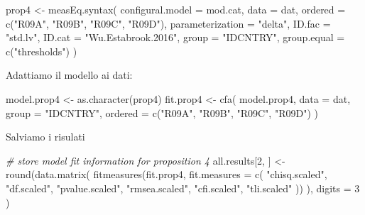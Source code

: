 \documentclass[
  11pt,
]{krantz}
\makeatletter
\newenvironment{Shaded}{\begin{snugshade}}{\end{snugshade}}
\newcommand{\AttributeTok}[1]{\textcolor[rgb]{0.61,0.61,0.61}{#1}}
\newcommand{\CommentTok}[1]{\textcolor[rgb]{0.37,0.37,0.37}{\textit{#1}}}
\newcommand{\DecValTok}[1]{\textcolor[rgb]{0.06,0.06,0.06}{#1}}
\newcommand{\FunctionTok}[1]{\textcolor[rgb]{0,0,0}{#1}}
\newcommand{\NormalTok}[1]{#1}
\newcommand{\OtherTok}[1]{\textcolor[rgb]{0.37,0.37,0.37}{#1}}
\newcommand{\StringTok}[1]{\textcolor[rgb]{0.5,0.5,0.5}{#1}}
\newenvironment{kframe}{%
\medskip{}
\setlength{\fboxsep}{.8em}
 \def\at@end@of@kframe{}%
 \ifinner\ifhmode%
  \def\at@end@of@kframe{\end{minipage}}%
  \begin{minipage}{\columnwidth}%
 \fi\fi%
 \def\FrameCommand##1{\hskip\@totalleftmargin \hskip-\fboxsep
 \colorbox{shadecolor}{##1}\hskip-\fboxsep
     \hskip-\linewidth \hskip-\@totalleftmargin \hskip\columnwidth}%
 \MakeFramed {\advance\hsize-\width
   \@totalleftmargin\z@ \linewidth\hsize
   \@setminipage}}%
 {\par\unskip\endMakeFramed%
 \at@end@of@kframe}
\renewenvironment{Shaded}{\begin{kframe}}{\end{kframe}}
\theoremstyle{definition}
\theoremstyle{definition}
\theoremstyle{definition}
\theoremstyle{definition}
\theoremstyle{remark}
\makeatother
\begin{document}
\begin{Shaded}
\begin{Highlighting}[]
\NormalTok{prop4 }\OtherTok{\textless{}{-}} \FunctionTok{measEq.syntax}\NormalTok{(}
  \AttributeTok{configural.model =}\NormalTok{ mod.cat,}
  \AttributeTok{data =}\NormalTok{ dat,}
  \AttributeTok{ordered =} \FunctionTok{c}\NormalTok{(}\StringTok{"R09A"}\NormalTok{, }\StringTok{"R09B"}\NormalTok{, }\StringTok{"R09C"}\NormalTok{, }\StringTok{"R09D"}\NormalTok{),}
  \AttributeTok{parameterization =} \StringTok{"delta"}\NormalTok{,}
  \AttributeTok{ID.fac =} \StringTok{"std.lv"}\NormalTok{,}
  \AttributeTok{ID.cat =} \StringTok{"Wu.Estabrook.2016"}\NormalTok{,}
  \AttributeTok{group =} \StringTok{"IDCNTRY"}\NormalTok{,}
  \AttributeTok{group.equal =} \FunctionTok{c}\NormalTok{(}\StringTok{"thresholds"}\NormalTok{)}
\NormalTok{)}
\end{Highlighting}
\end{Shaded}

Adattiamo il modello ai dati:

\begin{Shaded}
\begin{Highlighting}[]
\NormalTok{model.prop4 }\OtherTok{\textless{}{-}} \FunctionTok{as.character}\NormalTok{(prop4)}
\NormalTok{fit.prop4 }\OtherTok{\textless{}{-}} \FunctionTok{cfa}\NormalTok{(}
\NormalTok{  model.prop4,}
  \AttributeTok{data =}\NormalTok{ dat,}
  \AttributeTok{group =} \StringTok{"IDCNTRY"}\NormalTok{,}
  \AttributeTok{ordered =} \FunctionTok{c}\NormalTok{(}\StringTok{"R09A"}\NormalTok{, }\StringTok{"R09B"}\NormalTok{, }\StringTok{"R09C"}\NormalTok{, }\StringTok{"R09D"}\NormalTok{)}
\NormalTok{)}
\end{Highlighting}
\end{Shaded}

Salviamo i risulati

\begin{Shaded}
\begin{Highlighting}[]
\CommentTok{\# store model fit information for proposition 4}
\NormalTok{all.results[}\DecValTok{2}\NormalTok{, ] }\OtherTok{\textless{}{-}}
  \FunctionTok{round}\NormalTok{(}\FunctionTok{data.matrix}\NormalTok{(}
    \FunctionTok{fitmeasures}\NormalTok{(fit.prop4, }\AttributeTok{fit.measures =} \FunctionTok{c}\NormalTok{(}
      \StringTok{"chisq.scaled"}\NormalTok{, }\StringTok{"df.scaled"}\NormalTok{, }\StringTok{"pvalue.scaled"}\NormalTok{,}
      \StringTok{"rmsea.scaled"}\NormalTok{, }\StringTok{"cfi.scaled"}\NormalTok{, }\StringTok{"tli.scaled"}
\NormalTok{    ))}
\NormalTok{  ),}
  \AttributeTok{digits =} \DecValTok{3}
\NormalTok{  )}
\end{Highlighting}
\end{Shaded}
\end{document}
